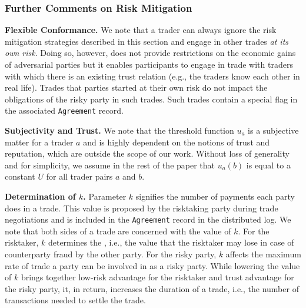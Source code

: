 
\subsubsection{Further Comments on Risk Mitigation}
\textbf{Flexible Conformance.} We note that a trader can always ignore the risk mitigation strategies described in this section and engage in other trades \emph{at its own risk}.
Doing so, however, does not provide restrictions on the economic gains of adversarial parties but it enables participants to engage in trade with traders with which there is an existing trust relation (e.g., the traders know each other in real life).
Trades that parties started at their own risk do not impact the obligations of the risky party in such trades.
Such trades contain a special flag in the associated \texttt{Agreement} record.

\textbf{Subjectivity and Trust.} We note that the threshold function $ u_a $ is a subjective matter for a trader $ a $ and is highly dependent on the notions of trust and reputation, which are outside the scope of our work.
Without loss of generality and for simplicity, we assume in the rest of the paper that $ u_a(b) $ is equal to a constant $ U $ for all trader pairs $ a $ and $ b $.

\textbf{Determination of $ k $.} 
Parameter $ k $ signifies the number of payments each party does in a trade.
This value is proposed by the risktaking party during trade negotiations and is included in the \texttt{Agreement} record in the distributed log.
We note that both sides of a trade are concerned with the value of $ k $.
For the risktaker, $ k $ determines the \MarginalStake{}, i.e., the value that the risktaker may lose in case of counterparty fraud by the other party.
For the risky party, $ k $ affects the maximum rate of trade a party can be involved in as a risky party.
While lowering the value of $ k $ brings together low-risk advantage for the risktaker and trust advantage for the risky party, it, in return, increases the duration of a trade, i.e., the number of transactions needed to settle the trade.

